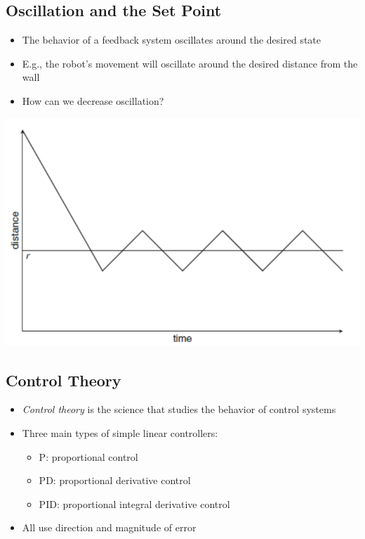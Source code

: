 \documentclass[10pt]{article}
\begin{document}
\subsection*{Oscillation and the Set Point}
\begin{itemize}
	\item The behavior of a feedback system oscillates around the desired state
	\item E.g., the robot's movement will oscillate around the desired distance from the wall
	\item How can we decrease oscillation?
\end{itemize}
\begin{center} 
	\includegraphics*[width=\textwidth]{L2_8.png} 
\end{center}

\subsection*{Control Theory}
\begin{itemize}
	\item \textit{Control theory} is the science that studies the behavior of control systems
	\item Three main types of simple linear controllers:
	\begin{itemize}
        \item P: proportional control
        \item PD: proportional derivative control
        \item PID: proportional integral derivative control
    \end{itemize}
    \item All use direction and magnitude of error
\end{itemize}
\end{document}
